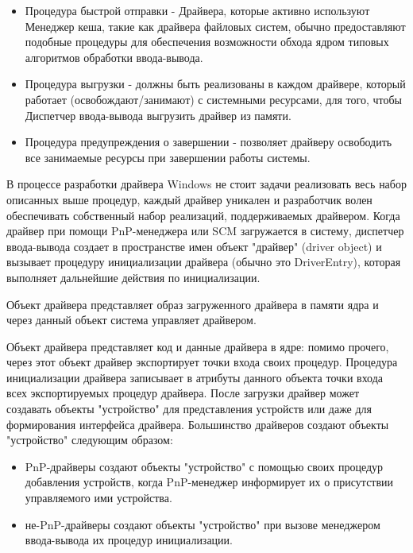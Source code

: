 \documentclass[14pt,a4paper]{article}
\begin{document}
\begin{itemize}
\item Процедура быстрой отправки - Драйвера, которые активно используют Менеджер кеша, такие как драйвера файловых систем, обычно предоставляют подобные процедуры для обеспечения возможности обхода ядром типовых алгоритмов обработки ввода-вывода.
\item Процедура выгрузки - должны быть реализованы в каждом драйвере, который работает (освобождают/занимают) с системными ресурсами, для того, чтобы Диспетчер ввода-вывода выгрузить драйвер из памяти.
\item Процедура предупреждения о завершении - позволяет драйверу освободить все занимаемые ресурсы при завершении работы системы.
\end{itemize}

\par В процессе разработки драйвера Windows не стоит задачи реализовать весь набор описанных выше процедур, каждый драйвер уникален и разработчик волен обеспечивать собственный набор реализаций, поддерживаемых драйвером. Когда драйвер при помощи PnP-менеджера или SCM загружается в систему, диспетчер ввода-вывода создает в пространстве имен объект "драйвер" (driver object) и вызывает процедуру инициализации драйвера (обычно это DriverEntry), которая выполняет дальнейшие действия по инициализации.\\

\par Объект драйвера представляет образ загруженного драйвера в памяти ядра и через данный объект система управляет драйвером.\\
\par Объект драйвера представляет код и данные драйвера в ядре: помимо прочего, через этот объект драйвер экспортирует точки входа своих процедур. Процедура инициализации драйвера записывает в атрибуты данного объекта точки входа всех экспортируемых процедур драйвера. После загрузки драйвер может создавать объекты "устройство" для представления устройств или даже для формирования интерфейса драйвера. Большинство драйверов создают объекты "устройство" следующим образом:

\begin{itemize}
\item PnP-драйверы создают объекты "устройство" с помощью своих процедур добавления устройств, когда PnP-менеджер информирует их о присутствии управляемого ими устройства.
\item не-PnP-драйверы создают объекты "устройство" при вызове менеджером ввода-вывода их процедур инициализации.
\end{itemize}
\end{document}

